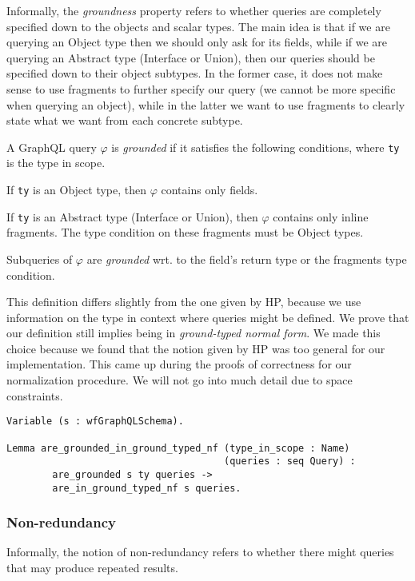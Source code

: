 Informally, the \textit{groundness} property refers to whether queries are completely specified down to the objects and scalar types. The main idea is that if we are querying an Object type then we should only ask for its fields, while if we are querying an Abstract type (Interface or Union), then our queries should be specified down to their object subtypes. In the former case, it does not make sense to use fragments to further specify our query (we cannot be more specific when querying an object), while in the latter we want to use fragments to clearly state what we want from each concrete subtype. 

\begin{definition}
A GraphQL query $\varphi$ is \textit{grounded} if it satisfies the following conditions, where \texttt{ty} is the type in scope.
\item If \texttt{ty} is an Object type, then $\varphi$ contains only fields.
\item If \texttt{ty} is an Abstract type (Interface or Union), then $\varphi$ contains only inline fragments. The type condition on these fragments must be Object types.
\item Subqueries of $\varphi$ are \textit{grounded} wrt. to the field's return type or the fragments type condition.
\end{definition}

This definition differs slightly from the one given by HP, because we use information on the type in context where queries might be defined. We prove that our definition still implies being in \textit{ground-typed normal form}. We made this choice because we found that the notion given by HP was too general for our implementation. This came up during the proofs of correctness for our normalization procedure. We will not go into much detail due to space constraints.

\begin{verbatim}
Variable (s : wfGraphQLSchema).

Lemma are_grounded_in_ground_typed_nf (type_in_scope : Name)
                                      (queries : seq Query) :
        are_grounded s ty queries ->
        are_in_ground_typed_nf s queries.
\end{verbatim}

\subsubsection*{Non-redundancy}

Informally, the notion of non-redundancy refers to whether there might queries that may produce repeated results.

